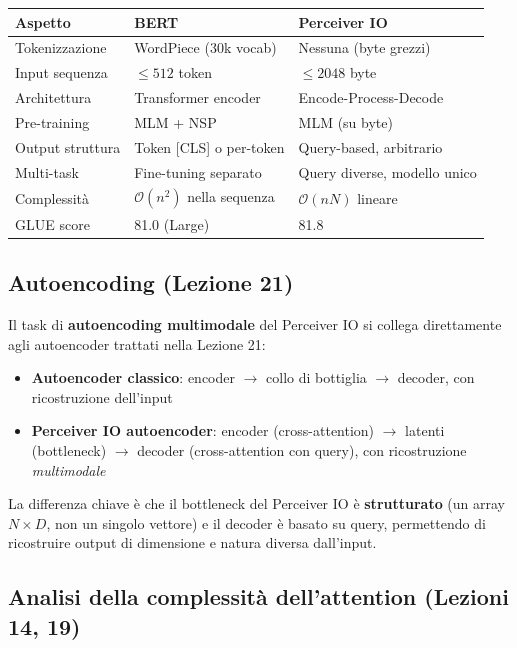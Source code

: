 \documentclass[12pt,a4paper]{article}
\begin{document}
\begin{center}
\begin{tabular}{lll}
\toprule
\textbf{Aspetto} & \textbf{BERT} & \textbf{Perceiver IO} \\
\midrule
Tokenizzazione & WordPiece (30k vocab) & Nessuna (byte grezzi) \\
Input sequenza & $\leq 512$ token & $\leq 2048$ byte \\
Architettura & Transformer encoder & Encode-Process-Decode \\
Pre-training & MLM + NSP & MLM (su byte) \\
Output struttura & Token [CLS] o per-token & Query-based, arbitrario \\
Multi-task & Fine-tuning separato & Query diverse, modello unico \\
Complessit\`a & $\mathcal{O}(n^2)$ nella sequenza & $\mathcal{O}(nN)$ lineare \\
GLUE score & 81.0 (Large) & 81.8 \\
\bottomrule
\end{tabular}
\end{center}

\subsection{Autoencoding (Lezione 21)}

Il task di \textbf{autoencoding multimodale} del Perceiver IO si collega direttamente agli autoencoder trattati nella Lezione 21:
\begin{itemize}
    \item \textbf{Autoencoder classico}: encoder $\to$ collo di bottiglia $\to$ decoder, con ricostruzione dell'input
    \item \textbf{Perceiver IO autoencoder}: encoder (cross-attention) $\to$ latenti (bottleneck) $\to$ decoder (cross-attention con query), con ricostruzione \emph{multimodale}
\end{itemize}

La differenza chiave \`e che il bottleneck del Perceiver IO \`e \textbf{strutturato} (un array $N \times D$, non un singolo vettore) e il decoder \`e basato su query, permettendo di ricostruire output di dimensione e natura diversa dall'input.

\subsection{Analisi della complessit\`a dell'attention (Lezioni 14, 19)}
\end{document}
